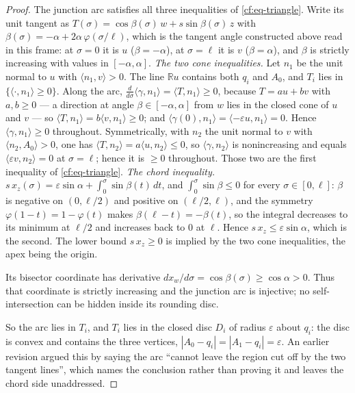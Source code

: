 \begin{proof}
The junction arc satisfies all three inequalities of \eqref{cf:eq-triangle}. Write
its unit tangent as $T(\sigma)=\cos\beta(\sigma)\,w+s\sin\beta(\sigma)\,z$ with
$\beta(\sigma)=-\alpha+2\alpha\,\varphi(\sigma/\ell)$, which is the tangent
angle constructed above read in this frame: at $\sigma=0$ it is $u$
($\beta=-\alpha$), at $\sigma=\ell$ it is $v$ ($\beta=\alpha$), and $\beta$ is
strictly increasing with values in $[-\alpha,\alpha]$.
\emph{The two cone inequalities.} Let $n_1$ be the unit normal to $u$ with
$\langle n_1,v\rangle>0$. The line $\mathbb Ru$ contains both $q_i$ and $A_0$,
and $T_i$ lies in $\{\langle\cdot,n_1\rangle\geq0\}$. Along the arc,
$\tfrac{d}{d\sigma}\langle\gamma,n_1\rangle=\langle T,n_1\rangle\geq0$, because
$T=au+bv$ with $a,b\geq0$ --- a direction at angle $\beta\in[-\alpha,\alpha]$
from $w$ lies in the closed cone of $u$ and $v$ --- so
$\langle T,n_1\rangle=b\langle v,n_1\rangle\geq0$; and
$\langle\gamma(0),n_1\rangle=\langle-\varepsilon u,n_1\rangle=0$. Hence
$\langle\gamma,n_1\rangle\geq0$ throughout. Symmetrically, with $n_2$ the unit
normal to $v$ with $\langle n_2,A_0\rangle>0$, one has $\langle
T,n_2\rangle=a\langle u,n_2\rangle\leq0$, so $\langle\gamma,n_2\rangle$ is
nonincreasing and equals $\langle\varepsilon v,n_2\rangle=0$ at $\sigma=\ell$;
hence it is $\geq0$ throughout. Those two are the first inequality of
\eqref{cf:eq-triangle}.
\emph{The chord inequality.} $s\,x_z(\sigma)=\varepsilon\sin\alpha+\int_0^\sigma
\sin\beta(t)\,dt$, and $\int_0^\sigma\sin\beta\leq0$ for every
$\sigma\in[0,\ell]$: $\beta$ is negative on $(0,\ell/2)$ and positive on
$(\ell/2,\ell)$, and the symmetry $\varphi(1-t)=1-\varphi(t)$ makes
$\beta(\ell-t)=-\beta(t)$, so the integral decreases to its minimum at
$\ell/2$ and increases back to $0$ at $\ell$. Hence $s\,x_z\leq\varepsilon
\sin\alpha$, which is the second. The lower bound $s\,x_z\geq0$ is implied by
the two cone inequalities, the apex being the origin.

Its bisector coordinate has derivative
$dx_w/d\sigma=\cos\beta(\sigma)\geq\cos\alpha>0$.
Thus that coordinate is strictly increasing and the junction arc is
injective; no self-intersection can be hidden inside its rounding disc.

So the arc lies in $T_i$, and $T_i$ lies in the closed disc $D_i$ of radius
$\varepsilon$ about $q_i$: the disc is convex and contains the three vertices,
$|A_0-q_i|=|A_1-q_i|=\varepsilon$. An earlier revision argued this by saying the
arc ``cannot leave the region cut off by the two tangent lines'', which names
the conclusion rather than proving it and leaves the chord side unaddressed.


\end{proof}
